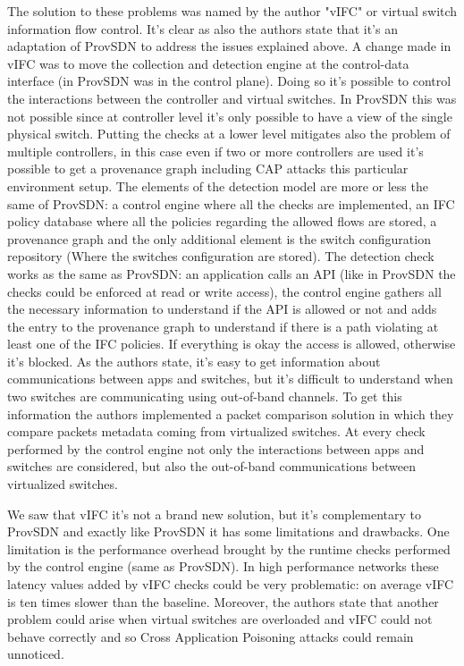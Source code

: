 The solution to these problems was named by the author "vIFC" or virtual switch information flow control. It's clear as also the authors state that it's an adaptation of ProvSDN to address the issues explained above. A change made in vIFC was to move the collection and detection engine at the control-data interface (in ProvSDN was in the control plane). Doing so it's possible to control the interactions between the controller and virtual switches. In ProvSDN this was not possible since at controller level it's only possible to have a view of the single physical switch. Putting the checks at a lower level mitigates also the problem of multiple controllers, in this case even if two or more controllers are used it's possible to get a provenance graph including CAP attacks this particular environment setup. The elements of the detection model are more or less the same of ProvSDN: a control engine where all the checks are implemented, an IFC policy database where all the policies regarding the allowed flows are stored, a provenance graph and the only additional element is the switch configuration repository (Where the switches configuration are stored). The detection check works as the same as ProvSDN: an application calls an API (like in ProvSDN the checks could be enforced at read or write access), the control engine gathers all the necessary information to understand if the API is allowed or not and adds the entry to the provenance graph to understand if there is a path violating at least one of the IFC policies. If everything is okay the access is allowed, otherwise it's blocked. As the authors state, it's easy to get information about communications between apps and switches, but it's difficult to understand when two switches are communicating using out-of-band channels. To get this information the authors implemented a packet comparison solution in which they compare packets metadata coming from virtualized switches. At every check performed by the control engine not only the interactions between apps and switches are considered, but also the out-of-band communications between virtualized switches.

We saw that vIFC it's not a brand new solution, but it's complementary to ProvSDN and exactly like ProvSDN it has some limitations and drawbacks. One limitation is the performance overhead brought by the runtime checks performed by the control engine (same as ProvSDN). In high performance networks these latency values added by vIFC checks could be very problematic: on average vIFC is ten times slower than the baseline. Moreover, the authors state that another problem could arise when virtual switches are overloaded and vIFC could not behave correctly and so Cross Application Poisoning attacks could remain unnoticed.

